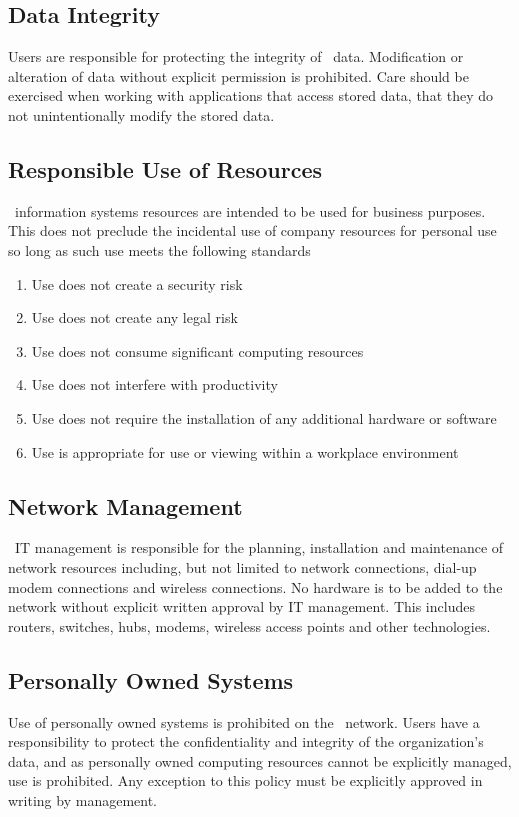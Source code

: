 \documentclass[use]{policy}
\begin{document}
		\subsection{Data Integrity}
			Users are responsible for protecting the integrity of \theOrganization\  data.  Modification or alteration of data without explicit permission is prohibited.  Care should be exercised when working with applications that access stored data, that they do not unintentionally modify the stored data.
	
		\subsection{Responsible Use of Resources}
			\theOrganization\  information systems resources are intended to be used for business purposes. This does not preclude the incidental use of company resources for personal use so long as such use meets the following standards
			
			\begin{enumerate}[label=\alph*)]
				\item Use does not create a security risk
				\item Use does not create any legal risk
				\item Use does not consume significant computing resources
				\item Use does not interfere with productivity
				\item Use does not require the installation of any additional hardware or software
				\item Use is appropriate for use or viewing within a workplace environment
			\end{enumerate}
		
		\subsection{Network Management}
			\theOrganization\  IT management is responsible for the planning, installation and maintenance of network resources including, but not limited to network connections, dial-up modem connections and wireless connections.  No hardware is to be added to the network without explicit written approval by IT management.  This includes routers, switches, hubs, modems, wireless access points and other technologies.  
	
		\subsection{Personally Owned Systems}
			Use of personally owned systems is prohibited on the \theOrganization\  network.  Users have a responsibility to protect the confidentiality and integrity of the organization’s data, and as personally owned computing resources cannot be explicitly managed, use is prohibited.  Any exception to this policy must be explicitly approved in writing by management.
		
\end{document}
